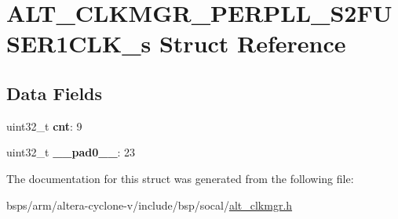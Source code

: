 \hypertarget{structALT__CLKMGR__PERPLL__S2FUSER1CLK__s}{}\section{A\+L\+T\+\_\+\+C\+L\+K\+M\+G\+R\+\_\+\+P\+E\+R\+P\+L\+L\+\_\+\+S2\+F\+U\+S\+E\+R1\+C\+L\+K\+\_\+s Struct Reference}
\label{structALT__CLKMGR__PERPLL__S2FUSER1CLK__s}
\subsection*{Data Fields}
\begin{DoxyCompactItemize}
\item 
\mbox{\label{structALT__CLKMGR__PERPLL__S2FUSER1CLK__s_ae3ce5b8b18dea723baecb91f0f3691de}} 
uint32\+\_\+t {\bfseries cnt}\+: 9
\item 
\mbox{\label{structALT__CLKMGR__PERPLL__S2FUSER1CLK__s_a17b9d0e913bb2d6609a4317bd6c062d8}} 
uint32\+\_\+t {\bfseries \+\_\+\+\_\+pad0\+\_\+\+\_\+}\+: 23
\end{DoxyCompactItemize}


The documentation for this struct was generated from the following file\+:\begin{DoxyCompactItemize}
\item 
bsps/arm/altera-\/cyclone-\/v/include/bsp/socal/\mbox{\hyperlink{alt__clkmgr_8h}{alt\+\_\+clkmgr.\+h}}\end{DoxyCompactItemize}
